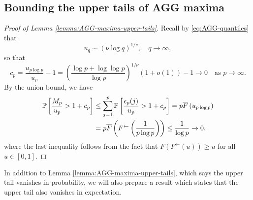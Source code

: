 \subsection{Bounding the upper tails of AGG maxima}
\label{subsec:bounding-upper-tails-of-maxima}


\begin{proof}[Proof of Lemma \ref{lemma:AGG-maxima-upper-tails}]
Recall by \eqref{eq:AGG-quantiles} that 
\begin{equation*}
    u_q\sim\left(\nu\log{q}\right)^{1/\nu}, \quad q\to\infty,
\end{equation*}
so that
\begin{equation} %
c_p  = \frac{u_{p\log{p}}}{u_p} -1 = \left(\frac{\log{p}+\log{\log{p}}}{\log{p}}\right)^{1/\nu}(1+o(1)) - 1 \rightarrow 0 \quad \mbox{as } p\to\infty.
\end{equation} 
By the union bound, we have
\begin{align}
    \P\left[\frac{M_p}{u_p} > 1+c_p\right] 
        &\le \sum_{j=1}^p \P\left[\frac{\epsilon_p(j)}{u_p} > 1+c_p\right] 
        = p \overline{F}\left(u_{p\log{p}}\right) \label{eq:AGG-maxima-upper-tails-proof-1} \\
        &= p \overline{F}\left(F^{\leftarrow}\left(\frac{1}{p\log{p}}\right)\right) \le \frac{1}{\log{p}} \rightarrow 0. \nonumber
\end{align}
where the last inequality follows from the fact that $F\left(F^{\leftarrow}(u)\right)\ge u$ for all $u\in[0,1]$.
\end{proof}

In addition to Lemma \ref{lemma:AGG-maxima-upper-tails}, which says the upper tail vanishes in probability, we will also prepare a result which states that the upper tail also vanishes in expectation.

